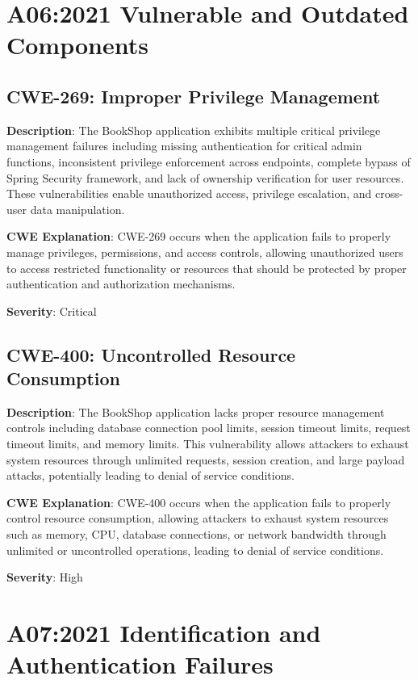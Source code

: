 \documentclass[]{UCD_CS_FYP_Report}
\begin{document}
\chapter{A06:2021 Vulnerable and Outdated Components}

\section{CWE-269: Improper Privilege Management}

\textbf{Description}: The BookShop application exhibits multiple critical privilege management failures including missing authentication for critical admin functions, inconsistent privilege enforcement across endpoints, complete bypass of Spring Security framework, and lack of ownership verification for user resources. These vulnerabilities enable unauthorized access, privilege escalation, and cross-user data manipulation.

\textbf{CWE Explanation}: CWE-269 occurs when the application fails to properly manage privileges, permissions, and access controls, allowing unauthorized users to access restricted functionality or resources that should be protected by proper authentication and authorization mechanisms.

\textbf{Severity}: Critical



\section{CWE-400: Uncontrolled Resource Consumption}

\textbf{Description}: The BookShop application lacks proper resource management controls including database connection pool limits, session timeout limits, request timeout limits, and memory limits. This vulnerability allows attackers to exhaust system resources through unlimited requests, session creation, and large payload attacks, potentially leading to denial of service conditions.

\textbf{CWE Explanation}: CWE-400 occurs when the application fails to properly control resource consumption, allowing attackers to exhaust system resources such as memory, CPU, database connections, or network bandwidth through unlimited or uncontrolled operations, leading to denial of service conditions.

\textbf{Severity}: High



\chapter{A07:2021 Identification and Authentication Failures}
\end{document}
